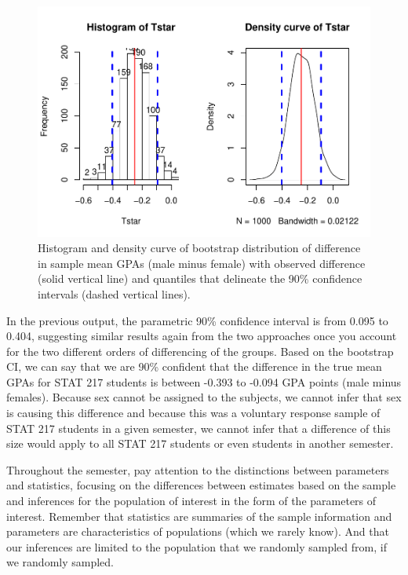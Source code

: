 \documentclass[]{book}
\begin{document}
\begin{figure}[htbp]
\centering
\includegraphics{GreenwoodBanner_files/figure-latex/Figure2-21-1.pdf}
\caption{\label{fig:Figure2-21}Histogram and density curve of bootstrap distribution of
difference in sample mean GPAs (male minus female) with observed
difference (solid vertical line) and quantiles that delineate the 90\%
confidence intervals (dashed vertical lines).}
\end{figure}

In the previous output, the parametric 90\% confidence interval is from
0.095 to 0.404, suggesting similar results again from the two approaches
once you account for the two different orders of differencing of the
groups. Based on the bootstrap CI, we can say that we are 90\% confident
that the difference in the true mean GPAs for STAT 217 students is
between -0.393 to -0.094 GPA points (male minus females). Because sex
cannot be assigned to the subjects, we cannot infer that sex is causing
this difference and because this was a voluntary response sample of STAT
217 students in a given semester, we cannot infer that a difference of
this size would apply to all STAT 217 students or even students in
another semester.

Throughout the semester, pay attention to the distinctions between
parameters and statistics, focusing on the differences between estimates
based on the sample and inferences for the population of interest in the
form of the parameters of interest. Remember that statistics are
summaries of the sample information and parameters are characteristics
of populations (which we rarely know). And that our inferences are
limited to the population that we randomly sampled from, if we randomly
sampled.
\end{document}
